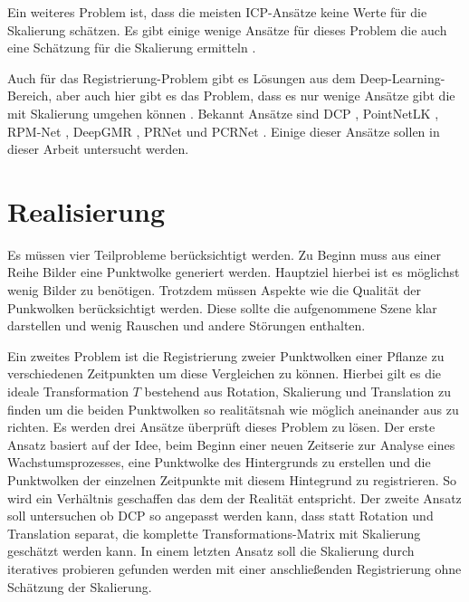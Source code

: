 \documentclass[12pt,titlepage, twoside]{article}
\begin{document}
Ein weiteres Problem ist, dass die meisten ICP-Ansätze keine Werte für die Skalierung schätzen. Es gibt einige wenige Ansätze für dieses Problem die auch eine Schätzung für die Skalierung ermitteln \cite{Ziner2005PointSR}.

Auch für das Registrierung-Problem gibt es Lösungen aus dem Deep-Learning-Bereich, aber auch hier gibt es das Problem, dass es nur wenige Ansätze gibt die mit Skalierung umgehen können \cite{ScaleLK}.
Bekannt Ansätze sind DCP \cite{Wang_2019_ICCV}, PointNetLK \cite{aoki2019pointnetlk}, RPM-Net \cite{Yew_2020}, DeepGMR \cite{yuan2020deepgmr}, PRNet \cite{wang2019prnet} und PCRNet \cite{sarode2019pcrnet}.
Einige dieser Ansätze sollen in dieser Arbeit untersucht werden.

\newpage
\section{Realisierung}
\label{sec:realisierung}
Es müssen vier Teilprobleme berücksichtigt werden. Zu Beginn muss aus einer Reihe Bilder eine Punktwolke generiert werden. Hauptziel hierbei ist es möglichst wenig Bilder zu benötigen. 
Trotzdem müssen Aspekte wie die Qualität der Punkwolken berücksichtigt werden. Diese sollte die aufgenommene Szene klar darstellen und wenig Rauschen und andere Störungen enthalten. 

Ein zweites Problem ist die Registrierung zweier Punktwolken einer Pflanze zu verschiedenen Zeitpunkten um diese Vergleichen zu können. 
Hierbei gilt es die ideale Transformation $T$ bestehend aus Rotation, Skalierung und Translation zu finden um die beiden Punktwolken so realitätsnah wie möglich aneinander aus zu richten.
Es werden drei Ansätze überprüft dieses Problem zu lösen. 
Der erste Ansatz basiert auf der Idee, beim Beginn einer neuen Zeitserie zur Analyse eines Wachstumsprozesses, eine Punktwolke des Hintergrunds zu erstellen und die Punktwolken der einzelnen Zeitpunkte mit diesem Hintegrund zu registrieren. 
So wird ein Verhältnis geschaffen das dem der Realität entspricht.
Der zweite Ansatz soll untersuchen ob DCP so angepasst werden kann, dass statt Rotation und Translation separat, die komplette Transformations-Matrix mit Skalierung geschätzt werden kann.
In einem letzten Ansatz soll die Skalierung durch iteratives probieren gefunden werden mit einer anschließenden Registrierung ohne Schätzung der Skalierung.
\end{document}
